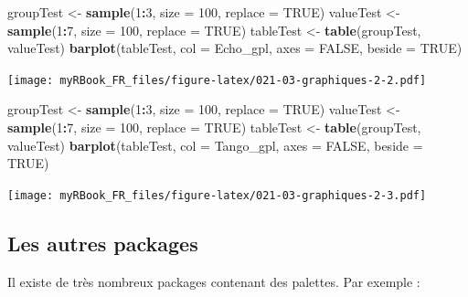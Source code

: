 \documentclass[]{book}
\newenvironment{Shaded}{\begin{snugshade}}{\end{snugshade}}
\newcommand{\DataTypeTok}[1]{\textcolor[rgb]{0.13,0.29,0.53}{#1}}
\newcommand{\DecValTok}[1]{\textcolor[rgb]{0.00,0.00,0.81}{#1}}
\newcommand{\KeywordTok}[1]{\textcolor[rgb]{0.13,0.29,0.53}{\textbf{#1}}}
\newcommand{\NormalTok}[1]{#1}
\newcommand{\OperatorTok}[1]{\textcolor[rgb]{0.81,0.36,0.00}{\textbf{#1}}}
\newcommand{\OtherTok}[1]{\textcolor[rgb]{0.56,0.35,0.01}{#1}}
\newcommand{\StringTok}[1]{\textcolor[rgb]{0.31,0.60,0.02}{#1}}
\begin{document}
\begin{Shaded}
\begin{Highlighting}[]
\NormalTok{groupTest <-}\StringTok{ }\KeywordTok{sample}\NormalTok{(}\DecValTok{1}\OperatorTok{:}\DecValTok{3}\NormalTok{, }\DataTypeTok{size =} \DecValTok{100}\NormalTok{, }\DataTypeTok{replace =} \OtherTok{TRUE}\NormalTok{) }
\NormalTok{valueTest <-}\StringTok{ }\KeywordTok{sample}\NormalTok{(}\DecValTok{1}\OperatorTok{:}\DecValTok{7}\NormalTok{, }\DataTypeTok{size =} \DecValTok{100}\NormalTok{, }\DataTypeTok{replace =} \OtherTok{TRUE}\NormalTok{)}
\NormalTok{tableTest <-}\StringTok{ }\KeywordTok{table}\NormalTok{(groupTest, valueTest)}
\KeywordTok{barplot}\NormalTok{(tableTest, }
  \DataTypeTok{col =}\NormalTok{ Echo_gpl, }\DataTypeTok{axes =} \OtherTok{FALSE}\NormalTok{, }\DataTypeTok{beside =} \OtherTok{TRUE}\NormalTok{)}
\end{Highlighting}
\end{Shaded}

\texttt{[image: myRBook\_FR\_files/figure-latex/021-03-graphiques-2-2.pdf]}

\begin{Shaded}
\begin{Highlighting}[]
\NormalTok{groupTest <-}\StringTok{ }\KeywordTok{sample}\NormalTok{(}\DecValTok{1}\OperatorTok{:}\DecValTok{3}\NormalTok{, }\DataTypeTok{size =} \DecValTok{100}\NormalTok{, }\DataTypeTok{replace =} \OtherTok{TRUE}\NormalTok{) }
\NormalTok{valueTest <-}\StringTok{ }\KeywordTok{sample}\NormalTok{(}\DecValTok{1}\OperatorTok{:}\DecValTok{7}\NormalTok{, }\DataTypeTok{size =} \DecValTok{100}\NormalTok{, }\DataTypeTok{replace =} \OtherTok{TRUE}\NormalTok{)}
\NormalTok{tableTest <-}\StringTok{ }\KeywordTok{table}\NormalTok{(groupTest, valueTest)}
\KeywordTok{barplot}\NormalTok{(tableTest, }
  \DataTypeTok{col =}\NormalTok{ Tango_gpl, }\DataTypeTok{axes =} \OtherTok{FALSE}\NormalTok{, }\DataTypeTok{beside =} \OtherTok{TRUE}\NormalTok{)}
\end{Highlighting}
\end{Shaded}

\texttt{[image: myRBook\_FR\_files/figure-latex/021-03-graphiques-2-3.pdf]}

\hypertarget{les-autres-packages}{%
\subsection{Les autres packages}\label{les-autres-packages}}

Il existe de très nombreux packages contenant des palettes. Par exemple :
\end{document}

